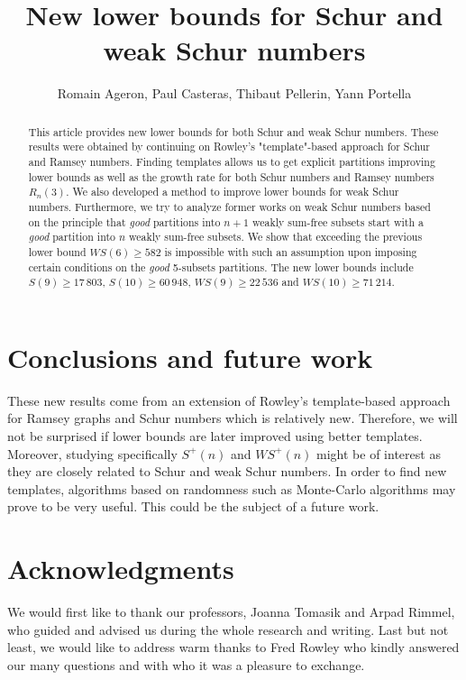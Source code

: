 \documentclass[3p]{elsarticle}
\title{New lower bounds for Schur and weak Schur numbers}
\author{Romain Ageron, Paul Casteras, Thibaut Pellerin, Yann Portella}
\newtheorem{computational theorem}[definition]{Computational Theorem}
\newcommand{\WS}{\mathit{WS}}
\begin{document}
\begin{abstract}

This article provides new lower bounds for both Schur and weak Schur numbers. These results were obtained by 
continuing on Rowley's "template"-based approach for Schur and Ramsey numbers. Finding templates allows us to 
get explicit partitions improving lower bounds as well as the growth rate for both Schur numbers and Ramsey 
numbers \(R_n(3)\). We also developed a method to improve lower bounds for weak Schur numbers. 
Furthermore, we try to analyze former works on weak Schur numbers based on the principle that \textit{good} 
partitions into \(n+1\) weakly sum-free subsets start with a \textit{good} partition into \(n\) weakly sum-free subsets. 
We show that exceeding the previous lower bound \(\WS (6) \geqslant 582\) is impossible with such an assumption 
upon imposing certain conditions on the \textit{good} 5-subsets partitions. The new lower bounds include 
\(S(9) \geqslant 17\,803\), \(S(10) \geqslant 60\,948\), \(\WS (9) \geqslant 22\,536\) and 
\(\WS (10) \geqslant 71\,214 \).

\end{abstract}

\maketitle







\section{Conclusions and future work}

\qquad These new results come from an extension of Rowley's template-based approach for Ramsey graphs and 
Schur numbers which is relatively new. Therefore, we will not be surprised if lower bounds are later improved 
using better templates. Moreover, studying specifically \(S^+(n)\) and \(\WS^+(n)\) might be of interest as they
 are closely related to Schur and weak Schur numbers. In order to find new templates, algorithms based on 
randomness such as Monte-Carlo algorithms may prove to be very useful. This could be the subject of a future work.

\section{Acknowledgments}

\qquad We would first like to thank our professors, Joanna Tomasik and Arpad Rimmel, who guided and advised
us during the whole research and writing. Last but not least, we would like to address warm thanks
to Fred Rowley who kindly answered our many questions and with who it was a pleasure to exchange.






\end{document}
